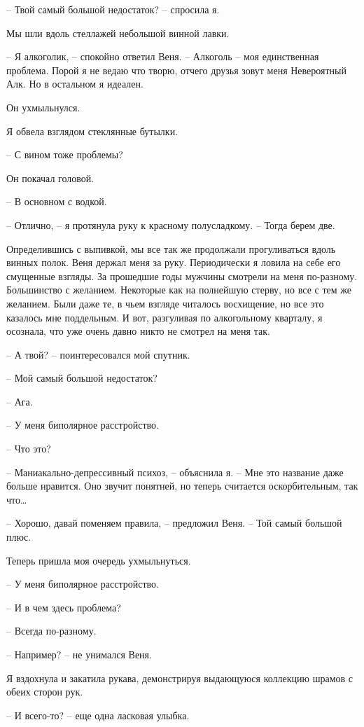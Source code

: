 \documentclass[
]{book}
\begin{document}
-- Твой самый большой недостаток? -- спросила я.

Мы шли вдоль стеллажей небольшой винной лавки.

-- Я алкоголик, -- спокойно ответил Веня. -- Алкоголь -- моя единственная проблема. Порой я не ведаю что творю, отчего друзья зовут меня Невероятный Алк. Но в остальном я идеален.

Он ухмыльнулся.

Я обвела взглядом стеклянные бутылки.

-- С вином тоже проблемы?

Он покачал головой.

-- В основном с водкой.

-- Отлично, -- я протянула руку к красному полусладкому. -- Тогда берем две.

Определившись с выпивкой, мы все так же продолжали прогуливаться вдоль винных полок. Веня держал меня за руку. Периодически я ловила на себе его смущенные взгляды. За прошедшие годы мужчины смотрели на меня по-разному. Большинство с желанием. Некоторые как на полнейшую стерву, но все с тем же желанием. Были даже те, в чьем взгляде читалось восхищение, но все это казалось мне поддельным. И вот, разгуливая по алкогольному кварталу, я осознала, что уже очень давно никто не смотрел на меня так.

-- А твой? -- поинтересовался мой спутник.

-- Мой самый большой недостаток?

-- Ага.

-- У меня биполярное расстройство.

-- Что это?

-- Маниакально-депрессивный психоз, -- объяснила я. -- Мне это название даже больше нравится. Оно звучит понятней, но
теперь считается оскорбительным, так что\ldots{}

-- Хорошо, давай поменяем правила, -- предложил Веня. -- Той самый большой плюс.

Теперь пришла моя очередь ухмыльнуться.

-- У меня биполярное расстройство.

-- И в чем здесь проблема?

-- Всегда по-разному.

-- Например? -- не унимался Веня.

Я вздохнула и закатила рукава, демонстрируя выдающуюся коллекцию шрамов с обеих сторон рук.

-- И всего-то? -- еще одна ласковая улыбка.
\end{document}

